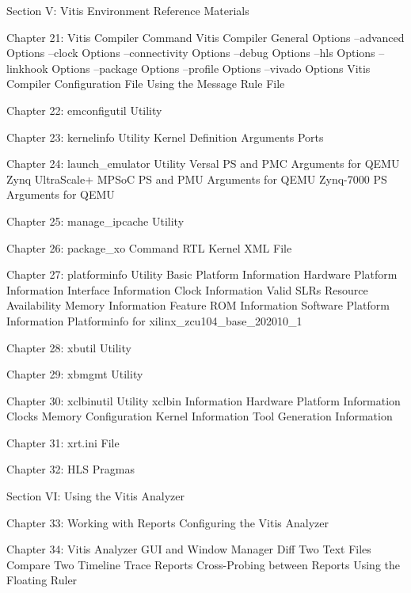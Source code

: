 Section  V: Vitis Environment Reference Materials  

    Chapter 21: Vitis Compiler Command      
        Vitis Compiler General Options 
        --advanced Options    
        --clock Options    
        --connectivity Options
        --debug Options    
        --hls Options      
        --linkhook Options    
        --package Options  
        --profile Options  
        --vivado Options      
        Vitis Compiler Configuration File    
        Using the Message Rule File 

    Chapter 22: emconfigutil Utility        

    Chapter 23: kernelinfo Utility 
        Kernel Definition  
        Arguments 
        Ports     

    Chapter 24: launch_emulator Utility  
        Versal PS and PMC Arguments for QEMU    
        Zynq UltraScale+ MPSoC PS and PMU Arguments for QEMU      
        Zynq-7000 PS Arguments for QEMU      

    Chapter 25: manage_ipcache Utility      

    Chapter 26: package_xo Command 
        RTL Kernel XML File

    Chapter 27: platforminfo Utility        
        Basic Platform Information     
        Hardware Platform Information        
        Interface Information       
        Clock Information  
        Valid SLRs   
        Resource Availability       
        Memory Information    
        Feature ROM Information     
        Software Platform Information        
        Platforminfo for xilinx_zcu104_base_202010_1     

    Chapter 28: xbutil Utility     

    Chapter 29: xbmgmt Utility     

    Chapter 30: xclbinutil Utility 
        xclbin Information    
        Hardware Platform Information        
        Clocks       
        Memory Configuration  
        Kernel Information    
        Tool Generation Information 

    Chapter 31: xrt.ini File       

    Chapter 32: HLS Pragmas 


Section  VI: Using the Vitis Analyzer    

    Chapter 33: Working with Reports        
        Configuring the Vitis Analyzer 

    Chapter 34: Vitis Analyzer GUI and Window Manager    
        Diff Two Text Files
        Compare Two Timeline Trace Reports      
        Cross-Probing between Reports        
        Using the Floating Ruler       

